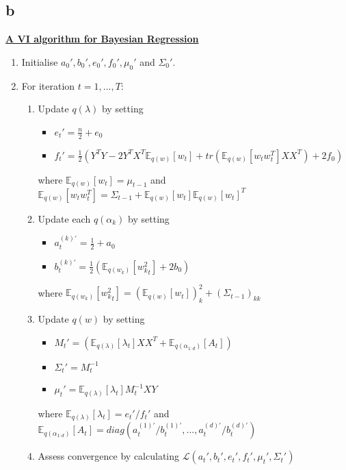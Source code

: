 \documentclass[twoside]{homework}
\begin{document}
\subsection*{b}
\textbf{\underline{A VI algorithm for Bayesian Regression}}
\begin{enumerate}
\item Initialise $a_0', b_0', e_0', f_0', \mu_0'$ and $\Sigma_0'$.
\item For iteration $t= 1, ..., T$:
\begin{enumerate}
\item Update $q(\lambda)$ by setting
	\begin{itemize} 
	\item $e_t' = \frac{n}{2} + e_0$
	\item $f_t' = \frac{1}{2}(Y^T  Y - 2 Y^T X^T \mathbb{E}_{q(w)}[w_t] + tr(\mathbb{E}_{q(w)}[w_t w_t^T] X X ^T) + 2f_0)$ 
	\end{itemize}
where $\mathbb{E}_{q(w)}[w_t] = \mu_{t-1}$ and $\mathbb{E}_{q(w)}[w_t w_t^T] = \Sigma_{t-1} + \mathbb{E}_{q(w)}[w_t] \mathbb{E}_{q(w)}[w_t]^T$
\item Update each $q(\alpha_k)$ by setting 
	\begin{itemize}
	 \item $a_{t}^{(k)'} = \frac{1}{2} + a_0$
	 \item $b_{t}^{(k)'} = \frac{1}{2}(\mathbb{E}_{q(w_k)}[{w_k^2}_t] + 2b_0)$
	\end{itemize}
where $\mathbb{E}_{q(w_k)}[{w_k^2}_t] = (\mathbb{E}_{q(w)}[w_t])_k^2 + (\Sigma_{t-1})_{kk}$
\item Update $q(w)$ by setting
	\begin{itemize}
	\item $M_{t}' = (\mathbb{E}_{q(\lambda)}[\lambda_t] X X^T + \mathbb{E}_{q(\alpha_{1:d})}[A_t])$
	\item $\Sigma_t' = M_t^{-1}$
	\item $\mu_t' =  \mathbb{E}_{q(\lambda)}[\lambda_t] M_{t}^{-1} X Y$
	\end{itemize}
where $\mathbb{E}_{q(\lambda)}[\lambda_t] = e_{t}' / f_{t}'$ and $\mathbb{E}_{q(\alpha_{1:d})}[A_t] = diag(a_{t}^{(1)'} / b_{t}^{(1)'}, ..., a_{t}^{(d)'} / b_{t}^{(d)'})$

\item Assess convergence by calculating $\mathcal{L}(a_t', b_t', e_t', f_t', \mu_t', \Sigma_t')$
\end{enumerate}
\end{enumerate}
\end{document}
